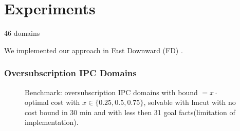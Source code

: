 


\newcommand{\scatterplotsize}{8cm}
\newcommand{\scatterplotxlabelshift}{1.5ex}
\newcommand{\scatterplotylabelshift}{-3ex}

\section{Experiments}
\label{experiments}

%

46 domains


We implemented our approach in Fast Downward (FD) \cite{helmert:jair-06}.  


\subsubsection*{Oversubscription IPC Domains}

\setlength{\tabcolsep}{2pt}
\renewcommand{\arraystretch}{0.8}
\begin{figure}[ht]
	\tiny
	\centering  
	\caption{
		Benchmark: oversubscription IPC
		domains with bound $ = x \cdot $ optimal cost with $
		x \in \{0.25, 0.5, 0.75\}$, solvable with lmcut with no cost bound in 
		30 min and with less then 31 goal facts(limitation of implementation).
	}
	\label{table:coverage_ipc}
\end{figure}

